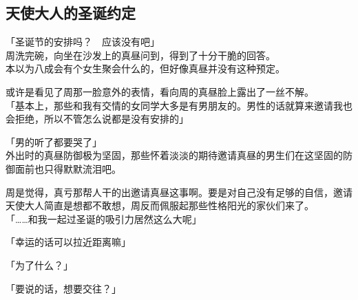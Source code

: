 \subsection{天使大人的圣诞约定}

「圣诞节的安排吗？　应该没有吧」\\

周洗完碗，向坐在沙发上的真昼问到，得到了十分干脆的回答。\\

本以为八成会有个女生聚会什么的，但好像真昼并没有这种预定。

或许是看见了周那一脸意外的表情，看向周的真昼脸上露出了一丝不解。\\

「基本上，那些和我有交情的女同学大多是有男朋友的。男性的话就算来邀请我也会拒绝，所以不管怎么说都是没有安排的」

「男的听了都要哭了」\\

外出时的真昼防御极为坚固，那些怀着淡淡的期待邀请真昼的男生们在这坚固的防御面前也只得默默流泪吧。

周是觉得，真亏那帮人干的出邀请真昼这事啊。要是对自己没有足够的自信，邀请天使大人简直是想都不敢想，周反而佩服起那些性格阳光的家伙们来了。\\

「……和我一起过圣诞的吸引力居然这么大呢」

「幸运的话可以拉近距离嘛」

「为了什么？」

「要说的话，想要交往？」


